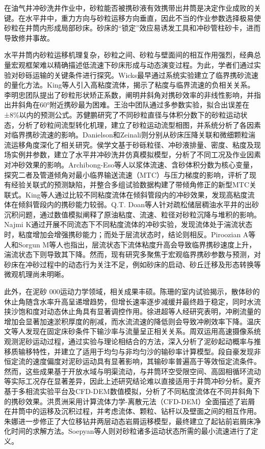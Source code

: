 
在油气井冲砂洗井作业中，砂粒能否被携砂液有效携带出井筒是决定作业成败的关键。在水平井中，重力方向与砂粒运移方向垂直，因此不当的作业参数选择极易使砂粒在井筒内形成局部砂床。砂床的“锁定”效应易诱发工具和冲砂管柱砂卡，进而导致修井事故。

水平井筒内砂粒运移机理复杂，砂粒之间、砂粒与壁面间的相互作用强烈，经典总量宏观框架难以精确描述低流速下砂床形成与动态演变过程。为此，学者们通过实验对砂砾运输的关键条件进行探究。Wicks最早通过系统实验建立了临界携砂流速的量化方法\cite{ref1}。King等人引入高粘度流体，揭示了粘度与临界流速的负相关关系\cite{ref2}。李明忠团队提出了砂粒形状矫正系数，阐明井斜角对携砂效率的非线性影响，并指出井斜角在60°附近携砂最为困难\cite{ref3,ref4}。王治中团队通过多参数实验，拟合出误差在±8\%以内的预测公式\cite{ref5}。苏健鹏研究了不同砂粒直径与体积分数下的砂粒运动状态，分析了砂粒间流型转化机理，建立了砂粒运动流型相图，并系统分析了各因素对临界携砂流速的影响\cite{ref6}。Danielson和Zeinali则分别从砂床压降关联和微细颗粒湍流运移角度深化了相关研究\cite{ref7,ref8}。侯学文基于砂砾粒径、冲砂液排量、密度、粘度及现场实例井参数，建立了水平井冲砂洗井仿真模拟模型，分析了不同工况及作业因素对冲砂效果的影响\cite{ref9}。Archibong-Eso等人以浆体流速、含砂体积分数为核心变量，探究二者及管道倾角对最小临界输送流速（MTC）与压力梯度的影响，评析了现有经验关联式的预测缺陷，并整合多组试验数据构建了带倾角修正的新型MTC关联式\cite{ref10}。King等人通过比较不同粘度流体在倾斜管段内的冲砂效果，发现高粘度流体在倾斜管段内的携砂能力较弱\cite{ref2}。Q.T. Doan等人针对疏松储层稠油水平井的出砂沉积问题，通过数值模拟阐释了原油粘度、流速、粒径对砂粒沉降与堆积的影响\cite{ref11}。Najmi K通过开展不同流态下不同粘度流体的冲砂实验，发现流体处于湍流状态时，粘度增加会增强携砂能力；而处于层流状态时，结论则相反\cite{ref12}。Piroozian A等人\cite{ref13}和Sorgun M等人也指出\cite{ref14}，层流状态下流体粘度升高会导致临界携砂速度上升，湍流状态下则导致其下降。然而，现有研究多聚焦于宏观临界携砂参数与预测，对砂床在冲砂过程中的动态行为关注不足，例如砂床的启动、砂丘迁移及形态转换等微观机理尚未明晰。

此外，在泥砂      000运动力学领域，相关成果丰硕。陈珊的室内试验揭示，散体砂的休止角随含水率升高呈递增趋势，但增长速率逐步减缓并最终趋于稳定，同时水流挟沙饱和度对动态休止角具有显著调控作用\cite{ref15}。徐进超等人经研究表明，冲刷流量的增加会显著加速淤积厚度的削减，而水流流速的降低则会导致冲刷效率下降\cite{ref16}。温庆文等人发现在固定床砂条件下输沙率与流量呈正相关关系\cite{ref17}。周双运用高速摄像系统观测泥砂运动过程，通过实验与理论相结合的方法，深入分析了泥砂起动概率与推移质输移特性，并建立了适用于均匀与非均匀沙的输砂率计算模型\cite{ref18}。段自豪发现非恒定流的速度偏度对泥砂运动具有显著影响，其输砂率普遍高于等效恒定流条件\cite{ref19}。然而，这些成果基于开放水域与明渠流动，与井筒环空受限空间、高固相循环流动等实际工况存在显著差异，因此上述研究结论难以直接适用于井筒冲砂分析\cite{ref20}。夏齐基于多相流实验平台及CFD-DEM数值模拟，分析了不同粘度流体在不同井斜角下的携砂效果\cite{ref21}。洪贯洲采用计算流体力学-离散元法（CFD-DEM）全面描述了岩屑在井筒中的运移及沉积过程，并考虑流体、颗粒、钻杆以及壁面之间的相互作用\cite{ref22}。朱娜进一步修正了大位移钻井两层动态岩屑运移模型，最终建立了起钻前岩屑床净化时间的求解方法\cite{ref23}。Soepyan等人则对砂粒诸多运动状态所需的最小流速进行了定义\cite{ref24}。

